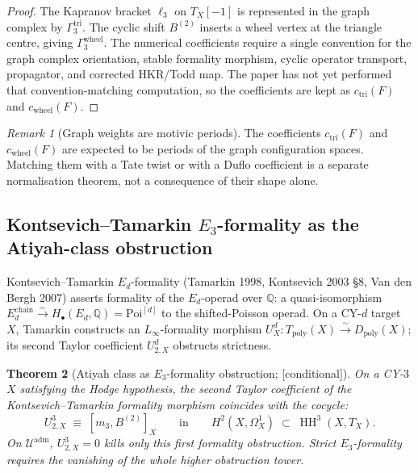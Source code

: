 \documentclass[11pt,reqno]{amsart}
\theoremstyle{plain}
\newtheorem{theorem}{Theorem}[section]
\theoremstyle{definition}
\theoremstyle{remark}
\newtheorem{remark}[theorem]{Remark}
\providecommand{\ClaimStatusConditional}{\textnormal{[conditional]}}
\DeclareMathOperator{\HH}{HH}
\newcommand{\Qbb}{\mathbb{Q}}
\newcommand{\cU}{\mathcal{U}}
\begin{document}
\begin{proof}
The Kapranov bracket $\ell_3$ on $T_X[-1]$ is represented in the graph complex by $\Gamma_3^{\mathrm{tri}}$. The cyclic shift $B^{(2)}$ inserts a wheel vertex at the triangle centre, giving $\Gamma_3^{\mathrm{wheel}}$. The numerical coefficients require a single convention for the graph complex orientation, stable formality morphism, cyclic operator transport, propagator, and corrected HKR/Todd map. The paper has not yet performed that convention-matching computation, so the coefficients are kept as $c_{\mathrm{tri}}(F)$ and $c_{\mathrm{wheel}}(F)$.
\end{proof}

\begin{remark}[Graph weights are motivic periods]
\label{rem:motivic-weights}
The coefficients $c_{\mathrm{tri}}(F)$ and $c_{\mathrm{wheel}}(F)$ are
expected to be periods of the graph configuration spaces. Matching
them with a Tate twist or with a Duflo coefficient is a separate
normalisation theorem, not a consequence of their shape alone.
\end{remark}

\subsection{Kontsevich--Tamarkin $E_3$-formality as the Atiyah-class obstruction}
\label{sub:KT-formality}
Kontsevich--Tamarkin $E_d$-formality (Tamarkin 1998, Kontsevich 2003 \S8, Van den Bergh 2007) asserts formality of the $E_d$-operad over $\Qbb$: a quasi-isomorphism $E_d^{\mathrm{chain}} \xrightarrow{\sim} H_\bullet(E_d, \Qbb) = \mathrm{Poi}^{[d]}$ to the shifted-Poisson operad. On a CY-$d$ target $X$, Tamarkin constructs an $L_\infty$-formality morphism $U^d_X : T_{\mathrm{poly}}(X) \xrightarrow{\sim} D_{\mathrm{poly}}(X)$; its second Taylor coefficient $U^d_{2,X}$ obstructs strictness.

\begin{theorem}[Atiyah class as $E_3$-formality obstruction; \ClaimStatusConditional]
\label{thm:formality-atiyah}
On a CY-$3$ $X$ satisfying the Hodge hypothesis, the second Taylor coefficient of the Kontsevich--Tamarkin formality morphism coincides with the cocycle:
\[
  U^3_{2,X} \;\equiv\; [m_3, B^{(2)}]_X \qquad \text{in} \qquad H^2(X, \Omega^1_X) \;\subset\; \HH^3(X, T_X).
\]
On $\cU^{\mathrm{adm}}$, $U^3_{2,X}=0$ kills only this first
formality obstruction. Strict $E_3$-formality requires the vanishing of
the whole higher obstruction tower.
\end{theorem}
\end{document}
